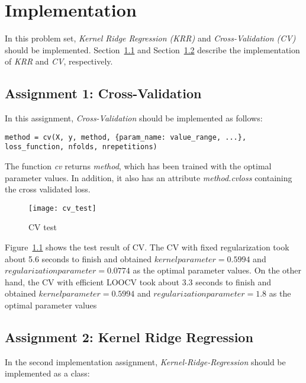 \chapter{Implementation}
\label{chap:implementation}

In this problem set, \textit{Kernel Ridge Regression (KRR)} and \textit{Cross-Validation (CV)} should be implemented. Section~\ref{sec:assignment1} and Section~\ref{sec:assignment2} describe the implementation of \textit{KRR} and \textit{CV}, respectively.

\section{Assignment 1: Cross-Validation}
\label{sec:assignment1}

In this assignment, \textit{Cross-Validation} should be implemented as follows:

\begin{center}
\texttt{method = cv(X, y, method, \{param\_name: value\_range, ...\}, loss\_function, nfolds, nrepetitions)}
\end{center}

The function \textit{cv} returns \textit{method}, which has been trained with the optimal parameter values. In addition, it also has an attribute \textit{method.cvloss} containing the cross validated loss.

\begin{figure}[h!]
	\centering
	\texttt{[image: cv\_test]}
	\caption{CV test}
	\label{fig:cvTest}
\end{figure}

Figure~\ref{fig:cvTest} shows the test result of CV. The CV with fixed regularization took about 5.6 seconds to finish and obtained $kernelparameter=0.5994$ and $regularizationparameter=0.0774$ as the optimal parameter values. On the other hand, the CV with efficient LOOCV took about 3.3 seconds to finish and obtained $kernelparameter=0.5994$ and $regularizationparameter=1.8$ as the optimal parameter values

\section{Assignment 2: Kernel Ridge Regression}
\label{sec:assignment2}

In the second implementation assignment, \textit{Kernel-Ridge-Regression} should be implemented as a class:

